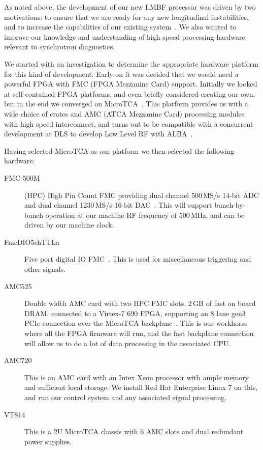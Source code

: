 \documentclass[
    a4paper,
    keeplastbox,            %
    hyphens,                %
    boxit,                  %
]{jacow}
\begin{document}
As noted above, the development of our new LMBF processor was driven by two
motivations: to ensure that we are ready for any new longitudinal instabilities,
and to increase the capabilities of our existing system~\cite{ipac2017rf,
ibic2016}.  We also wanted to improve our knowledge and understanding of high
speed processing hardware relevant to synchrotron diagnostics.

We started with an investigation to determine the appropriate hardware platform
for this kind of development.  Early on it was decided that we would need a
powerful FPGA with FMC (FPGA Mezzanine Card) support.  Initially we looked at
self contained FPGA platforms, and even briefly considered creating our own, but
in the end we converged on MicroTCA~\cite{mtca}.  This platform provides us with
a wide choice of crates and AMC (ATCA Mezzanine Card) processing modules with
high speed interconnect, and turns out to be compatible with a concurrent
development at DLS to develop Low Level RF with ALBA~\cite{ipac2017llrf}.

Having selected MicroTCA as our platform we then selected the following
hardware:

\begin{description}
\item[FMC-500M]
    (HPC) High Pin Count FMC providing dual channel 500\,MS/s 14-bit ADC and
    dual channel 1230\,MS/s 16-bit DAC~\cite{fmc500}.  This will support
    bunch-by-bunch operation at our machine RF frequency of 500\,MHz, and can be
    driven by our machine clock.
\item[FmcDIO5chTTLa]
    Five port digital IO FMC~\cite{fmcdio}.  This is used for miscellaneous
    triggering and other signals.
\item[AMC525]
    Double width AMC card with two HPC FMC slots, 2\,GB of fast on board DRAM,
    connected to a Virtex-7 690 FPGA, supporting an 8 lane gen3 PCIe connection
    over the MicroTCA backplane~\cite{amc525}.  This is our workhorse where all
    the FPGA firmware will run, and the fast backplane connection will allow us
    to do a lot of data processing in the associated CPU.
\item[AMC720]
    This is an AMC card with an Intex Xeon processor with ample memory and
    sufficient local storage.  We install Red Hat Enterprise Linux 7 on this,
    and run our control system and any associated signal processing.
\item[VT814]
    This is a 2U MicroTCA chassis with 6 AMC slots and dual redundant power
    supplies.
\end{description}
\end{document}
